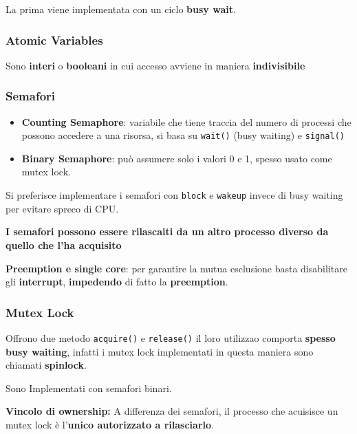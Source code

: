 La prima viene implementata con un ciclo \textbf{busy wait}.

\subsubsection{Atomic Variables}

Sono \textbf{interi} o \textbf{booleani} in cui accesso avviene in maniera \textbf{indivisibile}



\subsubsection{Semafori}

\begin{itemize}
  \item \textbf{Counting Semaphore}: variabile che tiene traccia del numero di processi che possono accedere a una risorsa, si basa su \verb|wait()| (busy waiting) e \verb|signal()|
  \item \textbf{Binary Semaphore}: può assumere solo i valori 0 e 1, spesso usato come mutex lock.
\end{itemize}

Si preferisce implementare i semafori con \verb|block| e \verb|wakeup| invece di busy waiting per evitare spreco di CPU.

\textbf{I semafori possono essere rilascaiti da un altro processo diverso da quello che l'ha acquisito}

\begin{tcolorbox}
  \textbf{Preemption e single core}: per garantire la mutua esclusione basta disabilitare gli \textbf{interrupt}, \textbf{impedendo} di fatto la \textbf{preemption}.
\end{tcolorbox}


\subsubsection{Mutex Lock}

Offrono due metodo \verb|acquire()| e \verb|release()| il loro utilizzao comporta
\textbf{spesso busy waiting}, infatti i mutex lock implementati in questa maniera sono
chiamati \textbf{spinlock}.

Sono Implementati con semafori binari.

\begin{tcolorbox}
  \textbf{Vincolo di ownership:} A differenza dei semafori, il processo che acuisisce un mutex lock è l'\textbf{unico autorizzato a rilasciarlo}.
\end{tcolorbox}

